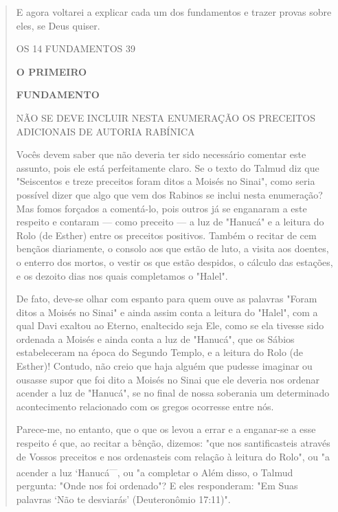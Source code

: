 \begin{quote}
E agora voltarei a explicar cada um dos fundamentos e trazer provas
sobre eles, se Deus quiser.

OS 14 FUNDAMENTOS 39

\textbf{O PRIMEIRO}

\textbf{FUNDAMENTO}

NÃO SE DEVE INCLUIR NESTA ENUMERAÇÃO OS PRECEITOS ADICIONAIS DE AUTORIA
RABÍNICA

Vocês devem saber que não deveria ter sido necessário comentar este
assunto, pois ele está perfeitamente claro. Se o texto do Talmud diz que
"Seiscen­tos e treze preceitos foram ditos a Moisés no Sinai", como
seria possível dizer que algo que vem dos Rabinos se inclui nesta
enumeração? Mas fomos forçados a comentá-lo, pois outros já se enganaram
a este respeito e contaram --- como pre­ceito --- a luz de "Hanucá" e a
leitura do Rolo (de Esther) entre os preceitos positi­vos. Também o
recitar de cem bençãos diariamente, o consolo aos que estão de luto, a
visita aos doentes, o enterro dos mortos, o vestir os que estão
despidos, o cálculo das estações, e os dezoito dias nos quais
completamos o "Halel".

De fato, deve-se olhar com espanto para quem ouve as palavras "Fo­ram
ditos a Moisés no Sinai" e ainda assim conta a leitura do "Halel", com a
qual Davi exaltou ao Eterno, enaltecido seja Ele, como se ela tivesse
sido orde­nada a Moisés e ainda conta a luz de "Hanucá", que os Sábios
estabeleceram na época do Segundo Templo, e a leitura do Rolo (de
Esther)! Contudo, não creio que haja alguém que pudesse imaginar ou
ousasse supor que foi dito a Moisés no Sinai que ele deveria nos ordenar
acender a luz de "Hanucá", se no final de nossa soberania um determinado
acontecimento relacionado com os gregos ocorresse entre nós.

Parece-me, no entanto, que o que os levou a errar e a enganar-se a esse
respeito é que, ao recitar a bênção, dizemos: "que nos santificasteis
atra­vés de Vossos preceitos e nos ordenasteis com relação à leitura do
Rolo", ou "a acender a luz `Hanucá\textsuperscript{---}, ou "a completar
o Além disso, o Talmud pergunta: "Onde nos foi ordenado"? E eles
responderam: "Em Suas palavras `Não te desviarás' (Deuteronômio 17:11)".


\end{quote}
